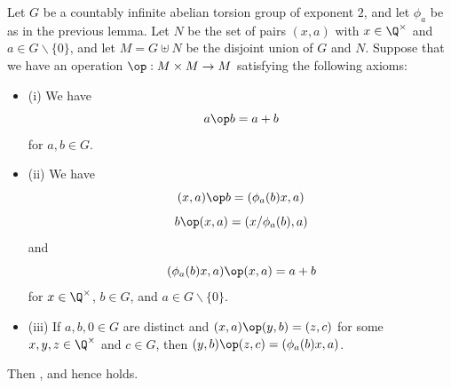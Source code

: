  \begin{lemma}\label{build-magma}\leanok{}  Let $G$ be a countably infinite abelian torsion group of exponent $2$, and let $\phi_a$ be as in the previous lemma.  Let $N$ be the set of pairs $(x,a)$ with $x \in \Q^\times$ and $a \in G \backslash \{0\}$, and let $M = G \uplus N$ be the disjoint union of $G$ and $N$.  Suppose that we have an operation $\op : M \times M \to M$ satisfying the following axioms:
\begin{itemize}
\item (i) We have
\begin{equation}\label{op-0}
  a \op b = a+b
\end{equation}
for $a,b \in G$.
\item (ii) We have
 \begin{equation}\label{op-1}
  (x,a) \op b = (\phi_a(b) x, a)
 \end{equation}
 \begin{equation}\label{op-2}
   b \op (x,a) = (x / \phi_a(b), a)
 \end{equation}
 and
 \begin{equation}\label{op-3}
   (\phi_a(b) x,a) \op (x,a) = a+b
 \end{equation}
 for $x \in \Q^\times$, $b \in G$, and $a \in G \backslash \{0\}$.
\item (iii) If $a,b,0 \in G$ are distinct and
$(x,a) \op (y,b) = (z,c)$ for some $x,y,z \in \Q^\times$ and $c \in G$, then $(y,b) \op (z,c) = (\phi_a(b) x,a)$.
\end{itemize}
Then ,  and hence  holds.
\end{lemma}

